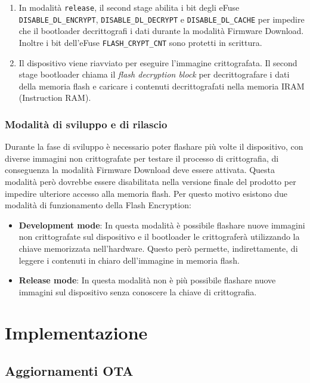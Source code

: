 \documentclass[a4paper]{article}
\begin{document}
\begin{enumerate}
  \item In modalità \texttt{release}, il second stage abilita i bit degli eFuse \\
    \texttt{DISABLE\_DL\_ENCRYPT}, \texttt{DISABLE\_DL\_DECRYPT} e \texttt{DISABLE\_DL\_CACHE}
    per impedire che il bootloader decrittografi i dati durante la modalità Firmware
    Download. Inoltre i bit dell'eFuse \texttt{FLASH\_CRYPT\_CNT} sono protetti in
    scrittura.

  \item Il dispositivo viene riavviato per eseguire l'immagine crittografata. Il second
    stage bootloader chiama il \textit{flash decryption block} per decrittografare i dati
    della memoria flash e caricare i contenuti decrittografati nella memoria IRAM
    (Instruction RAM).
\end{enumerate}

\subsubsection{Modalità di sviluppo e di rilascio}
Durante la fase di sviluppo è necessario poter flashare più volte il dispositivo,
con diverse immagini non crittografate per testare il processo di crittografia, di
conseguenza la modalità Firmware Download deve essere attivata. Questa modalità però
dovrebbe essere disabilitata nella versione finale del prodotto per impedire ulteriore
accesso alla memoria flash.
Per questo motivo esistono due modalità di funzionamento della Flash Encryption:
\begin{itemize}
  \item \textbf{Development mode}: In questa modalità è possibile flashare nuove immagini
    non crittografate sul dispositivo e il bootloader le crittograferà utilizzando
    la chiave memorizzata nell'hardware. Questo però permette, indirettamente, di
    leggere i contenuti in chiaro dell'immagine in memoria flash.
  \item \textbf{Release mode}: In questa modalità non è più possibile flashare nuove
    immagini sul dispositivo senza conoscere la chiave di crittografia.
\end{itemize}

\section{Implementazione}

\subsection{Aggiornamenti OTA}
\end{document}
